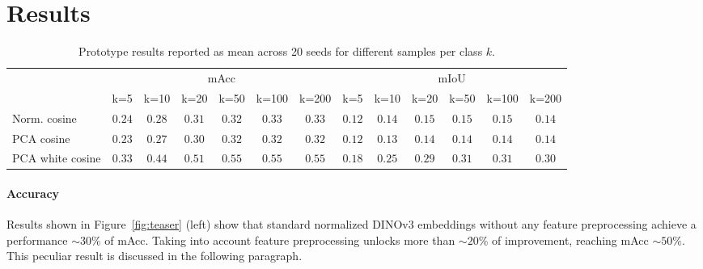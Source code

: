 \section{Results}
\label{sec:results}


\begin{table}[t]
\centering
\small
\begin{tabular}{lcccccc|cccccc}
\toprule
 & \multicolumn{6}{c|}{mAcc} & \multicolumn{6}{c}{mIoU} \\
\cmidrule(lr){2-7} \cmidrule(lr){8-13}
 & k=5 & k=10 & k=20 & k=50 & k=100 & k=200 & k=5 & k=10 & k=20 & k=50 & k=100 & k=200 \\
\midrule
Norm. cosine & $0.24$ & $0.28$ & $0.31$ & $0.32$ & $0.33$ & $0.33$ & $0.12$ & $0.14$ & $0.15$ & $0.15$ & $0.15$ & $0.14$ \\
PCA cosine & $0.23$ & $0.27$ & $0.30$ & $0.32$ & $0.32$ & $0.32$ & $0.12$ & $0.13$ & $0.14$ & $0.14$ & $0.14$ & $0.14$ \\
PCA white cosine & $0.33$ & $0.44$ & $0.51$ & $0.55$ & $0.55$ & $0.55$ & $0.18$ & $0.25$ & $0.29$ & $0.31$ & $0.31$ & $0.30$ \\
\bottomrule
\end{tabular}
\vspace{2mm} %
\caption{Prototype results reported as mean across 20 seeds for different samples per class $k$.}
\label{tab:prototype_results_mean_std}
\end{table}




\paragraph{Accuracy} Results shown in Figure~\ref{fig:teaser} (left) show that standard normalized DINOv3 embeddings without any feature preprocessing achieve a performance $\sim 30\%$ of mAcc. Taking into account feature preprocessing unlocks more than $\sim 20\%$ of improvement, reaching mAcc $\sim 50\%$.  This peculiar result is discussed in the following paragraph.

